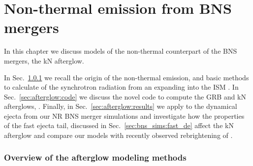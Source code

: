 
\chapter{Non-thermal emission from \ac{BNS} mergers} \label{ch:afterglow} 

In this chapter we discuss models of the non-thermal counterpart 
of the \ac{BNS} mergers, the \ac{kN} afterglow.

In Sec.~\ref{sec:intro:afterglow} we recall the origin of the non-thermal 
emission, and basic methods to calculate of the synchrotron 
radiation from an expanding into the \ac{ISM} \blast{}.
%
In Sec.~\ref{sec:afterglow:code} we discuss the novel 
code to compute the \ac{GRB} and \ac{kN} afterglows,
\pyblast{}. 
%
Finally, in Sec.~\ref{sec:afterglow:results} we apply \pyblast{} 
to the dynamical ejecta from our \ac{NR} 
\ac{BNS} merger simulations and investigate how the properties of the 
fast ejecta tail, discussed in Sec.~\ref{sec:bns_sims:fast_de} affect the 
\ac{kN} afterglow and compare our models with recently observed rebrightening 
of \GRB{}.
%




\subsection{Overview of the afterglow modeling methods}\label{sec:intro:afterglow}








